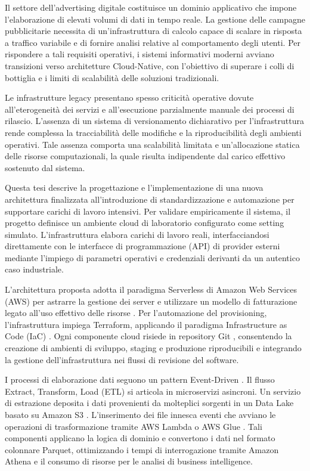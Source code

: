 Il settore dell'advertising digitale costituisce un dominio applicativo che impone l'elaborazione di elevati volumi di dati in tempo reale. La gestione delle campagne pubblicitarie necessita di un'infrastruttura di calcolo capace di scalare in risposta a traffico variabile e di fornire analisi relative al comportamento degli utenti. Per rispondere a tali requisiti operativi, i sistemi informativi moderni avviano transizioni verso architetture Cloud-Native, con l'obiettivo di superare i colli di bottiglia e i limiti di scalabilità delle soluzioni tradizionali.

Le infrastrutture legacy presentano spesso criticità operative dovute all'eterogeneità dei servizi e all'esecuzione parzialmente manuale dei processi di rilascio. L'assenza di un sistema di versionamento dichiarativo per l'infrastruttura rende complessa la tracciabilità delle modifiche e la riproducibilità degli ambienti operativi. Tale assenza comporta una scalabilità limitata e un'allocazione statica delle risorse computazionali, la quale risulta indipendente dal carico effettivo sostenuto dal sistema.

Questa tesi descrive la progettazione e l'implementazione di una nuova architettura finalizzata all'introduzione di standardizzazione e automazione per supportare carichi di lavoro intensivi. Per validare empiricamente il sistema, il progetto definisce un ambiente cloud di laboratorio configurato come setting simulato. L'infrastruttura elabora carichi di lavoro reali, interfacciandosi direttamente con le interfacce di programmazione (API) di provider esterni mediante l'impiego di parametri operativi e credenziali derivanti da un autentico caso industriale.

L'architettura proposta adotta il paradigma Serverless di Amazon Web Services (AWS) per astrarre la gestione dei server e utilizzare un modello di fatturazione legato all'uso effettivo delle risorse \cite{BerkeleyServerless, EivyEconomics}. Per l'automazione del provisioning, l'infrastruttura impiega Terraform, applicando il paradigma Infrastructure as Code (IaC) \cite{IaCGuerriero, TerraformUpAndRunning}. Ogni componente cloud risiede in repository Git \cite{Git}, consentendo la creazione di ambienti di sviluppo, staging e produzione riproducibili e integrando la gestione dell'infrastruttura nei flussi di revisione del software.

I processi di elaborazione dati seguono un pattern Event-Driven \cite{EventDrivenArchitecture}. Il flusso Extract, Transform, Load (ETL) si articola in microservizi asincroni. Un servizio di estrazione deposita i dati provenienti da molteplici sorgenti in un Data Lake basato su Amazon S3 \cite{S3Doc}. L'inserimento dei file innesca eventi che avviano le operazioni di trasformazione tramite AWS Lambda \cite{AWSLambdaDoc} o AWS Glue \cite{AWSGlueDoc}. Tali componenti applicano la logica di dominio e convertono i dati nel formato colonnare Parquet, ottimizzando i tempi di interrogazione tramite Amazon Athena \cite{Athena} e il consumo di risorse per le analisi di business intelligence.

